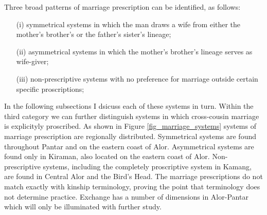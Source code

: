 Three broad patterns of marriage prescription can be identified, as follows: 
\begin{enumerate}
\item[(i)] symmetrical systems in which the man draws a wife from either the mother's brother's or the father's sister's lineage; 
\item[(ii)] asymmetrical systems in which the mother's brother's lineage serves as wife-giver; 
\item[(iii)] non-prescriptive systems with no preference for marriage outside certain specific proscriptions;
\end{enumerate}
In the following subsections I dsicuss each of these systems in turn. Within the third category we can further distinguish systems in which cross-cousin marriage is explicityly proscribed. As shown in Figure \ref{fig_marriage_systems} systems of marriage prescription are regionally distributed. Symmetrical systems are found throughout Pantar and on the eastern coast of Alor. Asymmetrical systems are found only in Kiraman, also located on the eastern coast of Alor. Non-prescriptive systems, including the completely proscriptive system in Kamang, are found in Central Alor and the Bird's Head. The marriage prescriptions do not match exactly with kinship terminology, proving the point that  terminology does not determine practice. Exchange has a number of dimensions in Alor-Pantar which will only be illuminated with further study.

